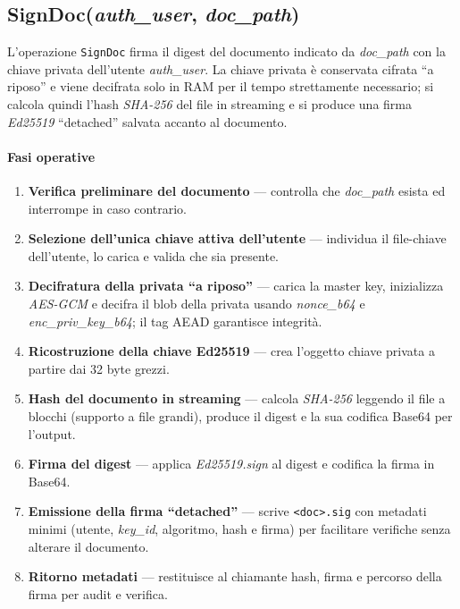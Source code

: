 \clearpage
\subsection{SignDoc(\textit{auth\_user}, \textit{doc\_path})}

L'operazione \texttt{SignDoc} firma il digest del documento indicato da \textit{doc\_path} con la chiave privata dell'utente \textit{auth\_user}. La chiave privata è conservata cifrata ``a riposo'' e viene decifrata solo in RAM per il tempo strettamente necessario; si calcola quindi l'hash \emph{SHA-256} del file in streaming e si produce una firma \emph{Ed25519} ``detached'' salvata accanto al documento.

\paragraph{Fasi operative }
\begin{enumerate}
  \item \textbf{Verifica preliminare del documento} — controlla che \textit{doc\_path} esista ed interrompe in caso contrario.
  \item \textbf{Selezione dell'unica chiave attiva dell'utente} — individua il file-chiave dell'utente, lo carica e valida che sia presente.
  \item \textbf{Decifratura della privata ``a riposo''} — carica la master key, inizializza \emph{AES-GCM} e decifra il blob della privata usando \textit{nonce\_b64} e \textit{enc\_priv\_key\_b64}; il tag AEAD garantisce integrità.
  \item \textbf{Ricostruzione della chiave Ed25519} — crea l'oggetto chiave privata a partire dai 32 byte grezzi.
  \item \textbf{Hash del documento in streaming} — calcola \emph{SHA-256} leggendo il file a blocchi (supporto a file grandi), produce il digest e la sua codifica Base64 per l'output.
  \item \textbf{Firma del digest} — applica \emph{Ed25519.sign} al digest e codifica la firma in Base64.
  \item \textbf{Emissione della firma ``detached''} — scrive \texttt{<doc>.sig} con metadati minimi (utente, \textit{key\_id}, algoritmo, hash e firma) per facilitare verifiche senza alterare il documento.
  \item \textbf{Ritorno metadati} — restituisce al chiamante hash, firma e percorso della firma per audit e verifica.
\end{enumerate}

